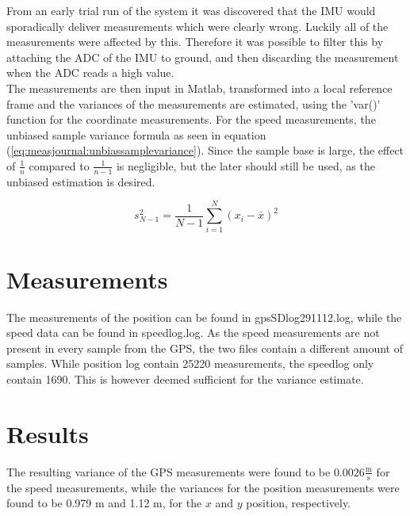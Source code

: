 From an early trial run of the system it was discovered that the IMU would sporadically deliver measurements which were clearly wrong. Luckily all of the measurements were affected by this. Therefore it was possible to filter this by attaching the ADC of the IMU to ground, and then discarding the measurement when the ADC reads a high value.\\
The measurements are then input in Matlab, transformed into a local reference frame and the variances of the measurements are estimated, using the 'var()' function for the coordinate measurements. For the speed measurements, the unbiased sample variance formula as seen in equation (\ref{eq:measjournal:unbiassamplevariance}). Since the sample base is large, the effect of $\frac{1}{n}$ compared to $\frac{1}{n-1}$ is negligible, but the later should still be used, as the unbiased estimation is desired.

\begin{equation}
s^2_{N-1} = \frac{1}{N-1} \sum^N_{i=1}(x_i-\overline{x})^2
\end{equation}
\label{eq:measjournal:unbiassamplevariance}
\section{Measurements}
The measurements of the position can be found in gpsSDlog291112.log, while the speed data can be found in speedlog.log. As the speed measurements are not present in every sample from the GPS, the two files contain a different amount of samples. While position log contain 25220 measurements, the speedlog only contain 1690. This is however deemed sufficient for the variance estimate.
\section{Results}
The resulting variance of the GPS measurements were found to be $0.0026\frac{\mathrm{m}}{\mathrm{s}}$ for the speed measurements, while the variances for the position measurements were found to be 0.979 m and 1.12 m, for the $x$ and $y$ position, respectively.